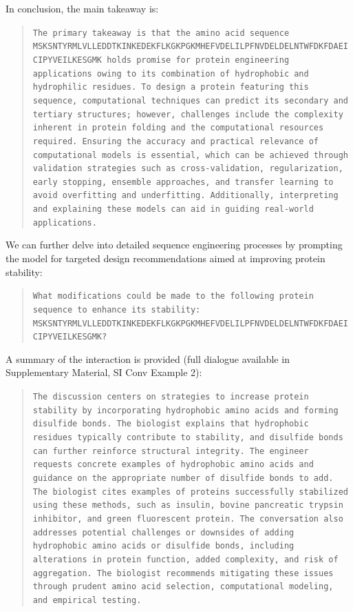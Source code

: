 In conclusion, the main takeaway is:

\begin{quote}
\small\texttt{The primary takeaway is that the amino acid sequence MSKSNTYRMLVLLEDDTKINKEDEKFLKGKPGKMHEFVDELILPFNVDELDELNTWFDKFDAEICIPYVEILKESGMK holds promise for protein engineering applications owing to its combination of hydrophobic and hydrophilic residues. To design a protein featuring this sequence, computational techniques can predict its secondary and tertiary structures; however, challenges include the complexity inherent in protein folding and the computational resources required. Ensuring the accuracy and practical relevance of computational models is essential, which can be achieved through validation strategies such as cross-validation, regularization, early stopping, ensemble approaches, and transfer learning to avoid overfitting and underfitting. Additionally, interpreting and explaining these models can aid in guiding real-world applications.}
\end{quote}

We can further delve into detailed sequence engineering processes by prompting the model for targeted design recommendations aimed at improving protein stability:

\begin{quote}
\small\texttt{What modifications could be made to the following protein sequence to enhance its stability: MSKSNTYRMLVLLEDDTKINKEDEKFLKGKPGKMHEFVDELILPFNVDELDELNTWFDKFDAEICIPYVEILKESGMK?}
\end{quote}

A summary of the interaction is provided (full dialogue available in Supplementary Material, SI Conv Example 2):

\begin{quote}
\small\texttt{The discussion centers on strategies to increase protein stability by incorporating hydrophobic amino acids and forming disulfide bonds. The biologist explains that hydrophobic residues typically contribute to stability, and disulfide bonds can further reinforce structural integrity. The engineer requests concrete examples of hydrophobic amino acids and guidance on the appropriate number of disulfide bonds to add. The biologist cites examples of proteins successfully stabilized using these methods, such as insulin, bovine pancreatic trypsin inhibitor, and green fluorescent protein. The conversation also addresses potential challenges or downsides of adding hydrophobic amino acids or disulfide bonds, including alterations in protein function, added complexity, and risk of aggregation. The biologist recommends mitigating these issues through prudent amino acid selection, computational modeling, and empirical testing.}
\end{quote}


